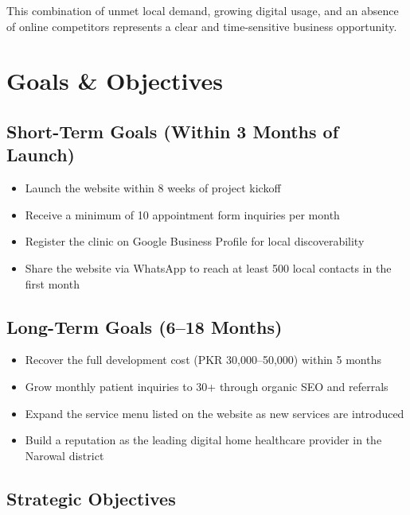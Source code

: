 \documentclass[12pt, a4paper]{article}
\begin{document}
This combination of unmet local demand, growing digital usage, and an absence of online competitors represents a clear and time-sensitive business opportunity.

\newpage

\section{Goals \& Objectives}

\subsection{Short-Term Goals (Within 3 Months of Launch)}

\begin{itemize}[leftmargin=1.4em]
    \item Launch the website within 8 weeks of project kickoff
    \item Receive a minimum of 10 appointment form inquiries per month
    \item Register the clinic on Google Business Profile for local discoverability
    \item Share the website via WhatsApp to reach at least 500 local contacts in the first month
\end{itemize}

\subsection{Long-Term Goals (6–18 Months)}

\begin{itemize}[leftmargin=1.4em]
    \item Recover the full development cost (PKR 30,000–50,000) within 5 months
    \item Grow monthly patient inquiries to 30+ through organic SEO and referrals
    \item Expand the service menu listed on the website as new services are introduced
    \item Build a reputation as the leading digital home healthcare provider in the Narowal district
\end{itemize}

\subsection{Strategic Objectives}
\end{document}

